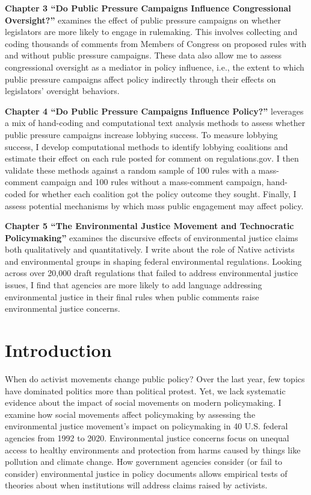 \documentclass[
      12pt,
        ]{article}
\begin{document}
\textbf{Chapter 3 ``Do Public Pressure Campaigns Influence Congressional Oversight?''} examines the effect of public pressure campaigns on whether legislators are more likely to engage in rulemaking. This involves collecting and coding thousands of comments from Members of Congress on proposed rules with and without public pressure campaigns. These data also allow me to assess congressional oversight as a mediator in policy influence, i.e., the extent to which public pressure campaigns affect policy indirectly through their effects on legislators' oversight behaviors.

\textbf{Chapter 4 ``Do Public Pressure Campaigns Influence Policy?''} leverages a mix of hand-coding and computational text analysis methods to assess whether public pressure campaigns increase lobbying success. To measure lobbying success, I develop computational methods to identify lobbying coalitions and estimate their effect on each rule posted for comment on regulations.gov. I then validate these methods against a random sample of 100 rules with a mass-comment campaign and 100 rules without a mass-comment campaign, hand-coded for whether each coalition got the policy outcome they sought. Finally, I assess potential mechanisms by which mass public engagement may affect policy.

\textbf{Chapter 5 ``The Environmental Justice Movement and Technocratic Policymaking''} examines the discursive effects of environmental justice claims both qualitatively and quantitatively. I write about the role of Native activists and environmental groups in shaping federal environmental regulations. Looking across over 20,000 draft regulations that failed to address environmental justice issues, I find that agencies are more likely to add language addressing environmental justice in their final rules when public comments raise environmental justice concerns.

\newpage

\onehalfspacing

\setcounter{page}{1}

\hypertarget{introduction}{%
\section{Introduction}\label{introduction}}

When do activist movements change public policy? Over the last year, few topics have dominated politics more than political protest. Yet, we lack systematic evidence about the impact of social movements on modern policymaking. I examine how social movements affect policymaking by assessing the environmental justice movement's impact on policymaking in 40 U.S. federal agencies from 1992 to 2020. Environmental justice
concerns focus on unequal access to healthy environments and
protection from harms caused by things like pollution and climate
change. How government agencies consider (or fail to consider) environmental justice in policy documents allows empirical tests of theories about when institutions will address claims raised by activists.
\end{document}
